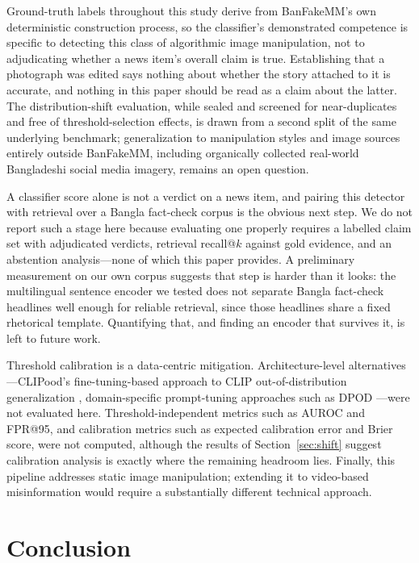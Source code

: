 \documentclass[conference,a4paper]{IEEEtran}
\begin{document}
Ground-truth labels throughout this study derive from BanFakeMM's own
deterministic construction process, so the classifier's demonstrated
competence is specific to detecting this class of algorithmic image
manipulation, not to adjudicating whether a news item's overall claim is
true. Establishing that a photograph was edited says nothing about whether the
story attached to it is accurate, and nothing in this paper should be read as
a claim about the latter.
The distribution-shift evaluation, while sealed and screened for
near-duplicates and free of threshold-selection effects, is drawn from a
second split of the same underlying benchmark; generalization to manipulation styles and image sources entirely
outside BanFakeMM, including organically collected real-world Bangladeshi
social media imagery, remains an open question.

A classifier score alone is not a verdict on a news item, and pairing this
detector with retrieval over a Bangla fact-check corpus is the obvious next
step. We do not report such a stage here because evaluating one properly
requires a labelled claim set with adjudicated verdicts, retrieval recall@$k$
against gold evidence, and an abstention analysis---none of which this paper
provides. A preliminary measurement on our own corpus suggests that step is
harder than it looks: the multilingual sentence encoder we tested does not
separate Bangla fact-check headlines well enough for reliable retrieval, since
those headlines share a fixed rhetorical template. Quantifying that, and
finding an encoder that survives it, is left to future work.

Threshold calibration is a data-centric mitigation. Architecture-level
alternatives---CLIPood's fine-tuning-based approach to CLIP
out-of-distribution generalization \cite{clipood}, domain-specific
prompt-tuning approaches such as DPOD \cite{dpod}---were not evaluated here.
Threshold-independent metrics such as AUROC and FPR@95, and calibration
metrics such as expected calibration error and Brier score, were not computed,
although the results of Section~\ref{sec:shift} suggest calibration analysis
is exactly where the remaining headroom lies. Finally, this pipeline addresses
static image manipulation; extending it to video-based misinformation would
require a substantially different technical approach.

\section{Conclusion}
\end{document}
